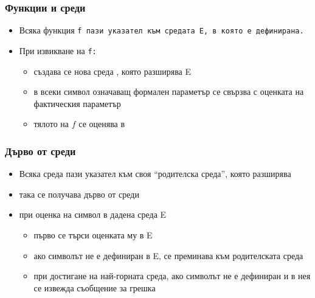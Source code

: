 \documentclass{beamer}
\begin{document}
\begin{frame}
  \frametitle{Функции и среди}

  \begin{itemize}[<+->]
  \item Всяка функция \tt f пази указател към средата \env E, в която е дефинирана.
  \item При извикване на \tt f:
    \begin{itemize}
    \item създава се нова среда , която разширява \env E
    \item в  всеки символ означаващ формален параметър се свързва с оценката на фактическия параметър
    \item тялото на $f$ се оценява в 
    \end{itemize}
  \end{itemize}
\end{frame}

\begin{frame}
  \frametitle{Дърво от среди}
  \begin{itemize}[<+->]
  \item Всяка среда пази указател към своя ``родителска среда'', която разширява
  \item така се получава дърво от среди
  \item при оценка на символ в дадена среда \env E
    \begin{itemize}
    \item първо се търси оценката му в \env E
    \item ако символът не е дефиниран в \env E, се преминава към родителската среда
    \item при достигане на най-горната среда, ако символът не е дефиниран и в нея се извежда съобщение за грешка
    \end{itemize}
  \end{itemize}
\end{frame}
\end{document}
